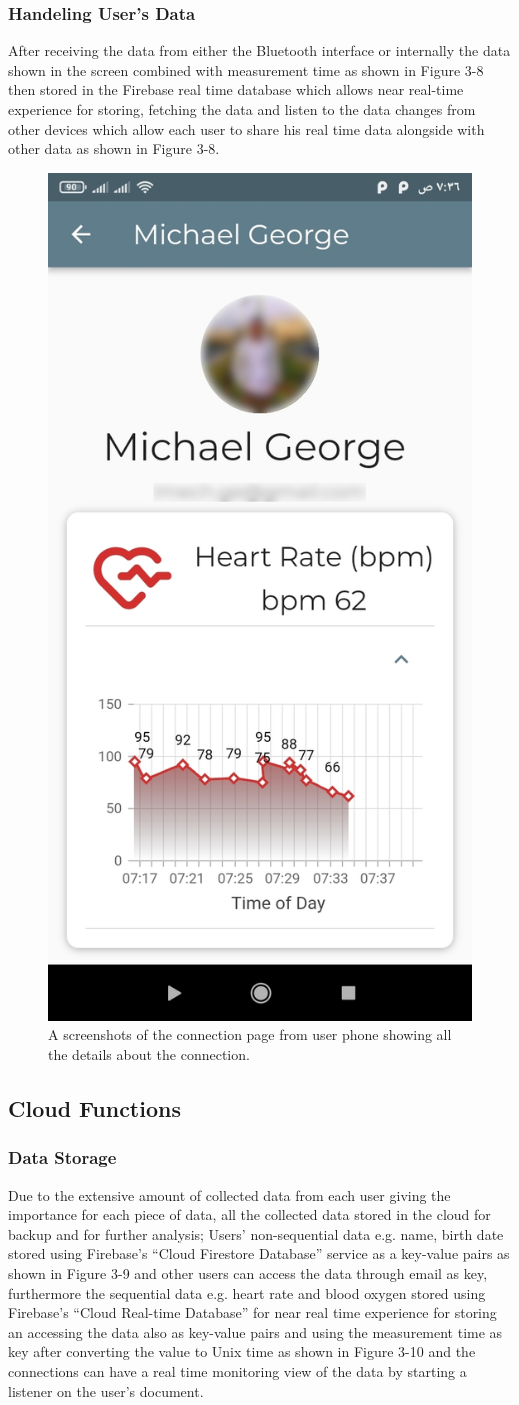 \documentclass{bmcart}
\begin{document}
\subsubsection*{Handeling User's Data}
After receiving the data from either the Bluetooth interface or internally the
data shown in the screen combined with measurement time as shown in Figure 3-8
then stored in the Firebase real time database which allows near real-time
experience for storing, fetching the data and listen to the data changes from
other devices which allow each user to share his real time data alongside with
other data as shown in Figure 3-8.
\begin{figure}[h!]
  \includegraphics[width=.3\linewidth]{jpg_images/connection_page.jpg}
  \caption{
      A screenshots of the connection page from user phone showing all the
      details about the connection.}
\end{figure}
\FloatBarrier


\subsection*{Cloud Functions}
\subsubsection*{Data Storage}
Due to the extensive amount of collected data from each user giving the
importance for each piece of data, all the collected data stored in the cloud
for backup and for further analysis; Users’ non-sequential data e.g. name, birth
date  stored using Firebase’s “Cloud Firestore Database” service as a key-value
pairs as shown in Figure 3-9 and other users can access the data through email
as key, furthermore the sequential data e.g. heart rate and blood oxygen stored
using Firebase’s “Cloud Real-time Database” for near real time experience for
storing an accessing the data also as key-value pairs and using the measurement
time as key after converting the value to Unix time as shown in Figure 3-10 and
the connections can have a real time monitoring  view of the data by starting a
listener on the user’s document.
\end{document}
